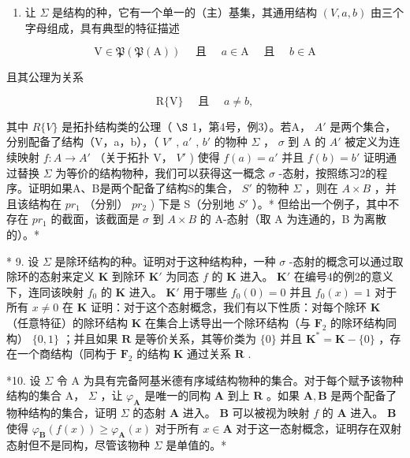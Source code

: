 \begin{enumerate}
\def\labelenumi{\arabic{enumi}.}
\setcounter{enumi}{7}
\tightlist
\item
  让 \(\Sigma\) 是结构的种，它有一个单一的（主）基集，其通用结构 \((V, a, b)\) 由三个字母组成，具有典型的特征描述
\end{enumerate}

\[
\mathrm{V} \in \mathfrak {P} (\mathfrak {P} (\mathrm{A})) \quad \text { 且 } \quad a \in \mathrm{A} \quad \text { 且 } \quad b \in \mathrm{A}
\]

且其公理为关系

\[
\mathrm{R} \{\mathrm{V} \} \quad \text { 且 } \quad a \neq b,
\]

其中 \(R\{V\}\) 是拓扑结构类的公理（ \(\S\) 1，第4号，例3）。若A， \(A'\) 是两个集合，分别配备了结构（V，a，b），（ \(V'\) , \(a'\) , \(b'\) 的物种 \(\Sigma\) ， \(\sigma\) 到 A 的 \(A'\) 被定义为连续映射 \(f: A \to A'\) （关于拓扑 V， \(V'\) ) 使得 \(f(a) = a'\) 并且 \(f(b) = b'\) 证明通过替换 \(\Sigma\) 为等价的结构物种，我们可以获得这一概念 \(\sigma\) -态射，按照练习2的程序。证明如果A、B是两个配备了结构S的集合， \(S'\) 的物种 \(\Sigma\) ，则在 \(A \times B\) ，并且该结构在 \(pr_{1}\) （分别） \(pr_{2}\) ) 下是 S（分别地 \(S'\) ）。* 但给出一个例子，其中不存在 \(pr_{1}\) 的截面，该截面是 \(\sigma\) 到 \(A \times B\) 的 A-态射（取 A 为连通的，B 为离散的）。*

* 9. 设 \(\Sigma\) 是除环结构的种。证明对于这种结构种，一种 \(\sigma\) -态射的概念可以通过取除环的态射来定义 \(\mathbf{K}\) 到除环 \(\mathbf{K}'\) 为同态 \(f\) 的 \(\mathbf{K}\) 进入。 \(\mathbf{K}'\) 在编号4的例2的意义下，连同该映射 \(f_0\) 的 \(\mathbf{K}\) 进入。 \(\mathbf{K}'\) 用于哪些 \(f_0(0) = 0\) 并且 \(f_0(x) = 1\) 对于所有 \(x \neq 0\) 在 \(\mathbf{K}\) 证明：对于这个态射概念，我们有以下性质：对每个除环 \(\mathbf{K}\) （任意特征）的除环结构 \(\mathbf{K}\) 在集合上诱导出一个除环结构（与 \(\mathbf{F}_2\) 的除环结构同构） \(\{0, 1\}\) ；并且如果 \(\mathbf{R}\) 是等价关系，其等价类为 \(\{0\}\) 并且 \(\mathbf{K}^* = \mathbf{K} - \{0\}\) ，存在一个商结构（同构于 \(\mathbf{F}_2\) 的结构 \(\mathbf{K}\) 通过关系 \(\mathbf{R}\) .

*10. 设 \(\Sigma\) 令 A 为具有完备阿基米德有序域结构物种的集合。对于每个赋予该物种结构的集合 A， \(\Sigma\) ，让 \(\varphi_{\mathbf{A}}\) 是唯一的同构 \(\mathbf{A}\) 到上 \(\mathbf{R}\) 。如果 \(\mathbf{A}, \mathbf{B}\) 是两个配备了物种结构的集合，证明 \(\Sigma\) 的态射 \(\mathbf{A}\) 进入。 \(\mathbf{B}\) 可以被视为映射 \(f\) 的 \(\mathbf{A}\) 进入。 \(\mathbf{B}\) 使得 \(\varphi_{\mathbf{B}}(f(x)) \geqslant \varphi_{\mathbf{A}}(x)\) 对于所有 \(x \in \mathbf{A}\) 对于这一态射概念，证明存在双射态射但不是同构，尽管该物种 \(\Sigma\) 是单值的。*

